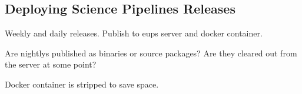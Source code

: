 \subsection{Deploying Science Pipelines Releases}
\label{sec:scipipe-deploy}

Weekly and daily releases. \label{sec:releases_weekly}\label{sec:releases_daily} Publish to eups server and docker container.

Are nightlys published as binaries or source packages? Are they cleared out from the server at some point?

Docker container is stripped to save space.
